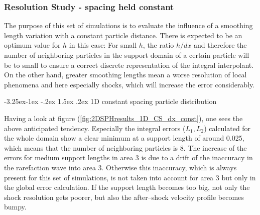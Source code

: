 \documentclass{report}
\makeatletter
\renewcommand\paragraph{\@startsection{paragraph}{4}{\z@}%
  {-3.25ex\@plus -1ex \@minus -.2ex}%
  {1.5ex \@plus .2ex}%
  {\normalfont\normalsize\bfseries}}
\makeatother
\begin{document}
\begin{figure}[H]
\centering
\label{fig:2DSPHresults_tempRes_vProfile}

\end{figure}



\subsubsection{Resolution Study - spacing held constant}
\label{sec:2DSPH_results_shock_resSTudy_dx=const}
The purpose of this set of simulations is to evaluate the influence of a smoothing length variation with a constant particle distance. There is expected to be an optimum value for $h$ in this case: For small $h$, the ratio $h/dx$ and therefore the number of neighboring particles in the support domain of a certain particle will be to small to ensure a correct discrete representation of the integral interpolant. On the other hand, greater smoothing lengths mean a worse resolution of local phenomena and here especially shocks, which will increase the error considerably. 


\paragraph{1D constant spacing particle distribution}

Having a look at figure (\ref{fig:2DSPHresults_1D_CS_dx_const}), one sees the above anticipated tendency. Especially the integral errors ($L_1,L_2$) calculated for the whole domain show a clear minimum at a support length of around 0.025, which means that the number of neighboring particles is 8. 
The increase of the errors for medium support lengths in area 3 is due to a drift of the inaccuracy in the rarefaction wave into area 3. Otherwise this inaccuracy, which is always present for this set of simulations, is not taken into account for area 3 but only in the global error calculation. 
If the support length becomes too big, not only the shock resolution gets poorer, but also the after--shock velocity profile becomes bumpy.
\end{document}
